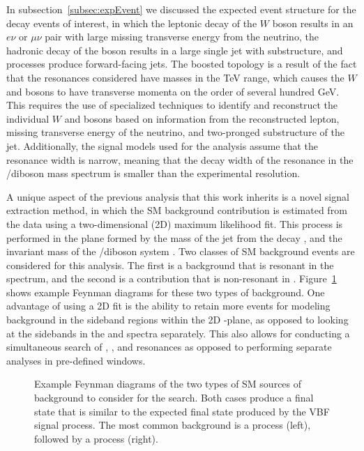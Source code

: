 In subsection~\ref{subsec:expEvent} we discussed the expected event structure for the decay events of interest, in which the leptonic decay of the $W$ boson results in an $e\nu$ or $\mu\nu$ pair with large missing transverse energy from the neutrino, the hadronic decay of the \VorH boson results in a large single jet with substructure, and \VBF processes produce forward-facing jets.
The boosted topology is a result of the fact that the resonances considered have masses in the TeV range, which causes the $W$ and \VorH bosons to have transverse momenta on the order of several hundred GeV.
This requires the use of specialized techniques to identify and reconstruct the individual $W$ and \VorH bosons based on information from the reconstructed lepton, missing transverse energy of the neutrino, and two-pronged substructure of the jet.
Additionally, the signal models used for the analysis assume that the resonance width is narrow, meaning that the decay width of the resonance in the \WV/\WH diboson mass spectrum is smaller than the experimental resolution.

A unique aspect of the previous analysis that this work inherits is a novel signal extraction method, in which the SM background contribution is estimated from the data using a two-dimensional (2D) maximum likelihood fit.
This process is performed in the plane formed by the mass of the jet from the \VorH decay \MJ, and the invariant mass of the \WV/\WH diboson system \MVV.
Two classes of SM background events are considered for this analysis.
The first is a \WVt background that is resonant in the \MJ spectrum, and the second is a \Wjets contribution that is non-resonant in \MJ.
Figure~\ref{fig:bkgFeynman} shows example Feynman diagrams for these two types of background.
One advantage of using a 2D fit is the ability to retain more events for modeling background in the sideband regions within the 2D \MJ-\MVV plane, as opposed to looking at the sidebands in the \MJ and \MVV spectra separately.
This also allows for conducting a simultaneous search of \WW, \WZ, and \WH resonances as opposed to performing separate analyses in pre-defined \MJ windows.

\begin{figure}[htbp]
  \centering
  
  \caption{
    Example Feynman diagrams of the two types of SM sources of background to consider for the search.
    Both cases produce a final state that is similar to the expected final state produced by the VBF signal process.
    The most common background is a \Wjets process (left), followed by a \WVt process (right).
  }
  \label{fig:bkgFeynman}
\end{figure}

